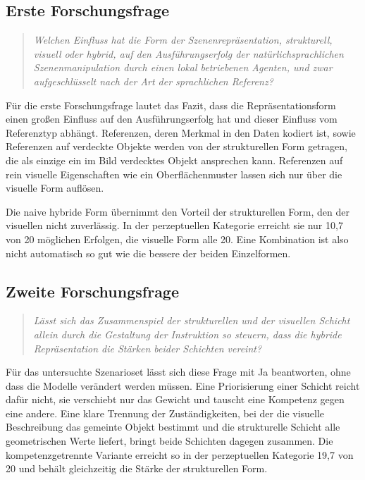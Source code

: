 \subsection*{Erste Forschungsfrage}

\begin{quote}
\textit{Welchen Einfluss hat die Form der Szenenrepräsentation, strukturell, visuell oder hybrid, auf den Ausführungserfolg der natürlichsprachlichen Szenenmanipulation durch einen lokal betriebenen Agenten, und zwar aufgeschlüsselt nach der Art der sprachlichen Referenz?}
\end{quote}

Für die erste Forschungsfrage lautet das Fazit, dass die Repräsentationsform einen großen Einfluss auf den Ausführungserfolg hat und dieser Einfluss vom Referenztyp abhängt.
Referenzen, deren Merkmal in den Daten kodiert ist, sowie Referenzen auf verdeckte Objekte werden von der strukturellen Form getragen, die als einzige ein im Bild verdecktes Objekt ansprechen kann.
Referenzen auf rein visuelle Eigenschaften wie ein Oberflächenmuster lassen sich nur über die visuelle Form auflösen.

Die naive hybride Form übernimmt den Vorteil der strukturellen Form, den der visuellen nicht zuverlässig.
In der perzeptuellen Kategorie erreicht sie nur 10,7 von 20 möglichen Erfolgen, die visuelle Form alle 20.
Eine Kombination ist also nicht automatisch so gut wie die bessere der beiden Einzelformen.

\subsection*{Zweite Forschungsfrage}

\begin{quote}
\textit{Lässt sich das Zusammenspiel der strukturellen und der visuellen Schicht allein durch die Gestaltung der Instruktion so steuern, dass die hybride Repräsentation die Stärken beider Schichten vereint?}
\end{quote}

Für das untersuchte Szenarioset lässt sich diese Frage mit Ja beantworten, ohne dass die Modelle verändert werden müssen.
Eine Priorisierung einer Schicht reicht dafür nicht, sie verschiebt nur das Gewicht und tauscht eine Kompetenz gegen eine andere.
Eine klare Trennung der Zuständigkeiten, bei der die visuelle Beschreibung das gemeinte Objekt bestimmt und die strukturelle Schicht alle geometrischen Werte liefert, bringt beide Schichten dagegen zusammen.
Die kompetenzgetrennte Variante erreicht so in der perzeptuellen Kategorie 19,7 von 20 und behält gleichzeitig die Stärke der strukturellen Form.


